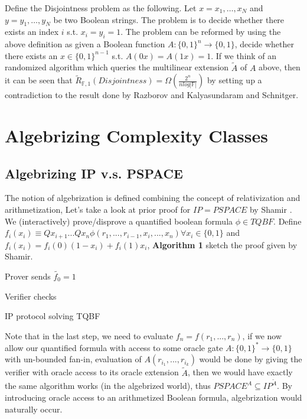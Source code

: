 \documentclass{article}
\begin{document}
  Define the Disjointness problem as the following. Let $x=x_1,\dots,x_N$ and $y=y_1,\dots,y_N$ be two Boolean strings. The problem is to decide whether there exists an index $i$ s.t. $x_i = y_i = 1$. The problem can be reformed by using the above definition as given a Boolean function $A: \{0,1\}^n \rightarrow \{0,1\}$, decide whether there exists an $x\in\{0,1\}^{n-1}$ s.t. $A(0x) = A(1x) = 1$. If we think of an randomized algorithm which queries the multilinear extension $\tilde{A}$ of $A$ above, then it can be seen that $\tilde{R}_{\mathbb{F},1}(Disjointness) = \Omega(\frac{2^n}{nlog|\mathbb{F}|})$ by setting up a contradiction to the result done by Razborov\cite{razborov1990distributional} and Kalyasundaram and Schnitger\cite{kalyanasundaram1992probabilistic}.

\section{Algebrizing Complexity Classes}
  
\subsection{Algebrizing IP v.s. PSPACE}

The notion of algebrization is defined combining the concept of relativization and arithmetization, Let's take a look at prior proof for $IP=PSPACE$ by Shamir \cite{shamir1990ip}. We (interactively) prove/disprove a quantified boolean formula $\phi\in TQBF$. Define $f_i(x_i)\equiv Qx_{i+1}...Qx_{n}\phi(r_1,...,r_{i-1},x_i,...,x_n)\forall x_i\in\{0,1\}$ and $f_i(x_i) = f_i(0)(1-x_i)+f_i(1)x_i$, {\bf Algorithm 1} sketch the proof given by Shamir.

\begin{algorithm}[H]
\SetAlgoLined
 Prover sends $\tilde{f_0}=1$\;
 
 
 Verifier checks 
 \caption{IP protocol solving TQBF}
\end{algorithm}

Note that in  the last step, we need to evaluate $f_n=f(r_1,...,r_n)$, if we now allow our quantified formula with access to some oracle gate $A:\{0,1\}^*\rightarrow\{0,1\}$ with un-bounded fan-in, evaluation of $A(r_{i_1},...,r_{i_k})$ would be done by giving the verifier with oracle access to its oracle extension $\tilde{A}$, then we would have exactly the same algorithm works (in the algebrized world), thus $PSPACE^{A}\subseteq IP^{\tilde{A}}.$ By introducing oracle access to an arithmetized Boolean formula, algebrization would naturally occur.
\end{document}
